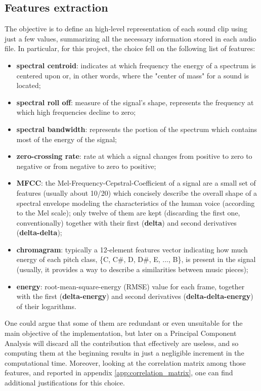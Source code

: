 \subsection{Features extraction}
\label{sec:features_extraction}
The objective is to define an high-level representation of each sound clip using just a few values, summarizing all the necessary information stored in each audio file. In particular, for this project, the choice fell on the following list of features:
\begin{itemize}
	\itemsep0em
	\item \textbf{spectral centroid}: indicates at which frequency the energy of a spectrum is centered upon or, in other words, where the "center of mass" for a sound is located;
	\item \textbf{spectral roll off}: measure of the signal's shape, represents the frequency at which high frequencies decline to zero;
	\item \textbf{spectral bandwidth}: represents the portion of the spectrum which contains most of the energy of the signal;
	\item \textbf{zero-crossing rate}: rate at which a signal changes from positive to zero to negative or from negative to zero to positive;
	\item \textbf{MFCC}: the Mel-Frequency-Cepstral-Coefficient of a signal are a small set of features (usually about 10/20) which concisely describe the overall shape of a spectral envelope modeling the characteristics of the human voice (according to the Mel scale); only twelve of them are kept (discarding the first one, conventionally) together with their first (\textbf{delta}) and second derivatives (\textbf{delta-delta});
	\item \textbf{chromagram}: typically a 12-element features vector indicating how much energy of each pitch class, \{C, C\#, D, D\#, E, ..., B\}, is present in the signal (usually, it provides a way to describe a similarities between music pieces);
	\item \textbf{energy}: root-mean-square-energy (RMSE) value for each frame, together with the first (\textbf{delta-energy}) and second derivatives (\textbf{delta-delta-energy}) of their logarithms.
\end{itemize}
One could argue that some of them are redundant or even unsuitable for the main objective of the implementation, but later on a Principal Component Analysis will discard all the contribution that effectively are useless, and so computing them at the beginning results in just a negligible increment in the computational time. Moreover, looking at the correlation matrix among those features, and reported in appendix \ref{app:correlation_matrix}, one can find additional justifications for this choice.\\
